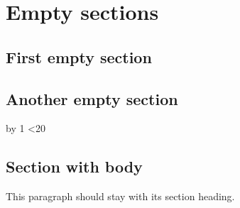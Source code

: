 \documentclass[oneside]{book}
\begin{document}
\chapter{Empty sections}
\section{First empty section}\label{first-empty}
\newcount\emptysection
{}
\loop
\section{Another empty section}
\advance\emptysection by 1
\ifnum\emptysection<20
\repeat
\section{Section with body}\label{body-heading}
This paragraph should stay with its section heading.
\label{body-paragraph}
\end{document}
